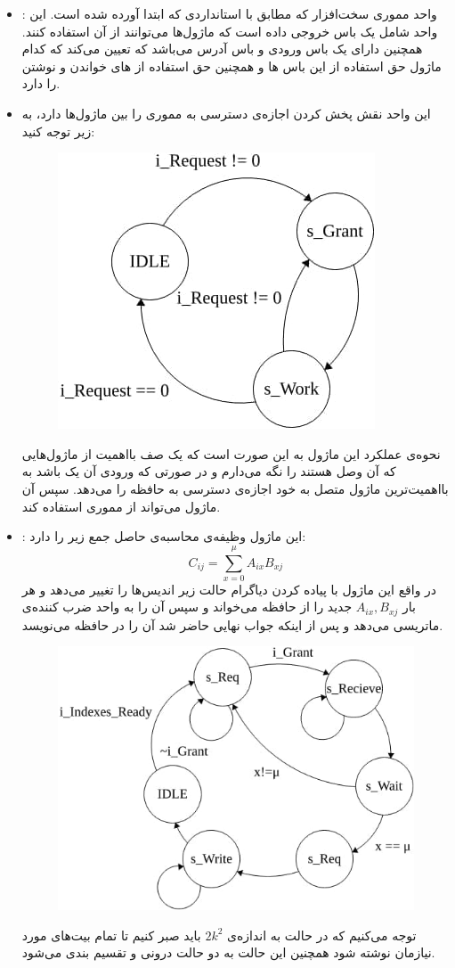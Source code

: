 \documentclass[12pt,onecolumn,a4paper,fleqn]{article}
\begin{document}
\begin{itemize}
	\item 
	:
	واحد مموری سخت‌افزار که مطابق با استانداردی که ابتدا آورده شده است. این واحد شامل یک باس خروجی داده است که ماژول‌ها می‌توانند از آن استفاده کنند. همچنین دارای یک باس ورودی و باس آدرس می‌باشد که  تعیین می‌کند که کدام ماژول حق استفاده از این باس ‌ها و همچنین حق استفاده از های‌ خواندن و نوشتن را دارد.
	\item 
	این واحد نقش پخش کردن اجازه‌ی دسترسی به مموری را بین ماژول‌ها دارد، به  زیر توجه کنید:
	
\begin{figure}[h]
	\centering
	\includegraphics[width=0.35\linewidth]{source/fsm_ar.jpg}
	\caption{}
\end{figure}

نحوه‌ی عملکرد این ماژول به این صورت است که یک صف بااهمیت از ماژول‌هایی که آن وصل هستند را نگه می‌دارم و در صورتی که ورودی  آن یک باشد به بااهمیت‌ترین ماژول متصل به خود اجازه‌ی دسترسی به حافظه را می‌دهد. سپس آن ماژول می‌تواند از مموری استفاده کند.
	
	\item 
	:
	این ماژول وظیفه‌ی محاسبه‌ی حاصل جمع زیر را دارد:
	$$ C_{ij} = \sum_{x=0}^\mu A_{ix}B_{xj} $$
	در واقع این ماژول با پیاده کردن دیاگرام حالت زیر اندیس‌ها را تغییر می‌دهد و هر بار $A_{ix},B_{xj}$ جدید را از حافظه‌ می‌خواند و سپس آن را به واحد ضرب کننده‌ی ماتریسی می‌دهد و پس از اینکه جواب نهایی حاضر شد آن را در حافظه می‌نویسد.
	\begin{figure}[h]
		\centering
		\includegraphics[width=0.4\linewidth]{source/fsm_cu.jpg}
		\caption{}
	\end{figure}
توجه می‌کنیم که در حالت  به اندازه‌ی
 $2k^2$
 باید صبر کنیم تا تمام بیت‌های مورد نیازمان نوشته شود همچنین این حالت به دو حالت درونی  و  تقسیم بندی می‌شود.
	

\end{itemize}
\end{document}
